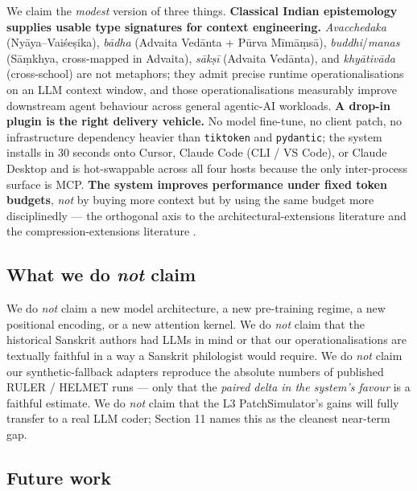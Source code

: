 We claim the \emph{modest} version of three things. \textbf{Classical Indian epistemology supplies usable type signatures for context engineering.} \emph{Avacchedaka} (Nyāya--Vaiśeṣika), \emph{bādha} (Advaita Vedānta + Pūrva Mīmāṃsā), \emph{buddhi}/\emph{manas} (Sāṃkhya, cross-mapped in Advaita), \emph{sākṣī} (Advaita Vedānta), and \emph{khyātivāda} (cross-school) are not metaphors; they admit precise runtime operationalisations on an LLM context window, and those operationalisations measurably improve downstream agent behaviour across general agentic-AI workloads. \textbf{A drop-in plugin is the right delivery vehicle.} No model fine-tune, no client patch, no infrastructure dependency heavier than \passthrough{\lstinline!tiktoken!} and \passthrough{\lstinline!pydantic!}; the system installs in 30 seconds onto Cursor, Claude Code (CLI / VS Code), or Claude Desktop and is hot-swappable across all four hosts because the only inter-process surface is MCP. \textbf{The system improves performance under fixed token budgets}, \emph{not} by buying more context but by using the same budget more disciplinedly --- the orthogonal axis to the architectural-extensions literature \citep{chen2023pi, peng2023yarn, ding2024longrope, gu2023mamba, lieber2024jamba} and the compression-extensions literature \citep{jiang2023llmlingua, jiang2024longllmlingua, chevalier2023autocompressors}.

\subsection{\texorpdfstring{What we do \emph{not} claim}{What we do not claim}}\label{what-we-do-not-claim}

We do \emph{not} claim a new model architecture, a new pre-training regime, a new positional encoding, or a new attention kernel. We do \emph{not} claim that the historical Sanskrit authors had LLMs in mind or that our operationalisations are textually faithful in a way a Sanskrit philologist would require. We do \emph{not} claim our synthetic-fallback adapters reproduce the absolute numbers of published RULER / HELMET runs --- only that the \emph{paired delta in the system's favour} is a faithful estimate. We do \emph{not} claim that the L3 PatchSimulator's gains will fully transfer to a real LLM coder; Section 11 names this as the cleanest near-term gap.

\subsection{Future work}\label{future-work}

